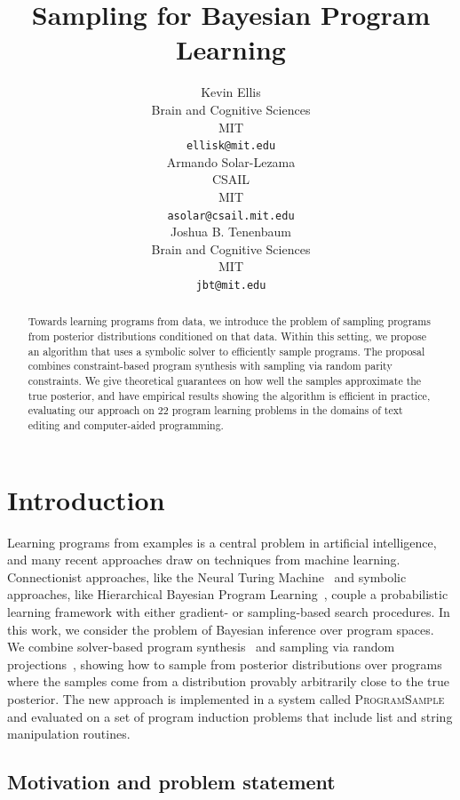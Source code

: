 \documentclass{article}
\title{Sampling for Bayesian Program Learning}
\author{
Kevin Ellis \\
Brain and Cognitive Sciences\\
MIT\\
\texttt{ellisk@mit.edu} \\
\And
Armando Solar-Lezama \\
  CSAIL\\
MIT \\
\texttt{asolar@csail.mit.edu} \\
\And
Joshua B. Tenenbaum \\
Brain and Cognitive Sciences\\
MIT\\
\texttt{jbt@mit.edu} \\
}
\newcommand{\theSystem}{\textsc{ProgramSample}}
\begin{document}

\maketitle

\begin{abstract}
  Towards learning programs from data, we introduce the problem of
  sampling programs from posterior distributions conditioned on that
  data. Within this setting, we propose an algorithm that uses a
  symbolic solver to efficiently sample programs.  The proposal
  combines constraint-based program synthesis with sampling via random
  parity constraints.  We give theoretical guarantees on how well the
  samples approximate the true posterior, and have empirical results
  showing the algorithm is efficient in practice, evaluating our
  approach on 22 program learning problems in the domains of text
  editing and computer-aided programming.
\end{abstract}

\section{Introduction}
\label{introduction}
Learning programs from examples is a central problem in artificial intelligence, and many recent approaches draw on techniques from machine learning.
Connectionist approaches, like the Neural Turing Machine~\cite{graves2014neural,DBLP:journals/corr/ReedF15} and symbolic approaches, like Hierarchical Bayesian Program Learning~\cite{lake2015human,DBLP:conf/icml/LiangJK10,menon2013machine},
couple a probabilistic learning framework with either gradient- or sampling-based search procedures.
In this work,
we consider the problem of Bayesian inference over program spaces.
We combine solver-based program synthesis~\cite{solar2008program} and sampling via random projections~\cite{ermon2013embed},
showing how to sample from posterior distributions over programs where the samples come from a distribution provably arbitrarily close to the true posterior. The new approach is implemented in a system called \theSystem{}
and evaluated on a set of program induction problems that include list 
and string manipulation routines. 


\subsection{Motivation and problem statement}
\newlength{\mylength}
\setlength{\mylength}{0.25cm}   %
\end{document}
